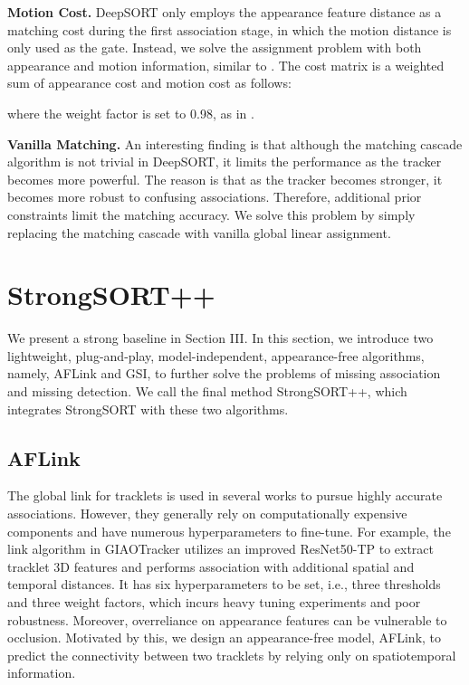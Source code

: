 \documentclass[lettersize,journal]{IEEEtran}
\begin{document}
\noindent \textbf{Motion Cost.}
DeepSORT only employs the appearance feature distance as a matching cost during the first association stage, 
in which the motion distance is only used as the gate. 
Instead, we solve the assignment problem with both appearance and motion information, similar to \cite{wang2020towards,zhang2021fairmot}.
The cost matrix  is a weighted sum of appearance cost  and motion cost  as follows:

where the weight factor  is set to 0.98, as in \cite{wang2020towards,zhang2021fairmot}.

\noindent \textbf{Vanilla Matching.}
An interesting finding is that although the matching cascade algorithm is not trivial in DeepSORT,
it limits the performance as the tracker becomes more powerful.
The reason is that as the tracker becomes stronger, it becomes more robust to confusing associations.
Therefore, additional prior constraints limit the matching accuracy.
We solve this problem by simply replacing the matching cascade with vanilla global linear assignment.

\section{StrongSORT++}

We present a strong baseline in Section III.
In this section, we introduce two lightweight, plug-and-play, model-independent, appearance-free algorithms, 
namely, AFLink and GSI, to further solve the problems of missing association and missing detection.
We call the final method StrongSORT++, which integrates StrongSORT with these two algorithms.

\subsection{AFLink}

The global link for tracklets is used in several works to pursue highly accurate associations.
However, they generally rely on computationally expensive components and have numerous hyperparameters to fine-tune.
For example, the link algorithm in GIAOTracker \cite{du2021giaotracker} utilizes an improved ResNet50-TP \cite{gao2018revisiting} to extract tracklet 3D features 
and performs association with additional spatial and temporal distances.
It has six hyperparameters to be set, i.e., three thresholds and three weight factors,
which incurs heavy tuning experiments and poor robustness.
Moreover, overreliance on appearance features can be vulnerable to occlusion.
Motivated by this, we design an appearance-free model, AFLink, to predict the connectivity between two tracklets by relying only on spatiotemporal information.
\end{document}
